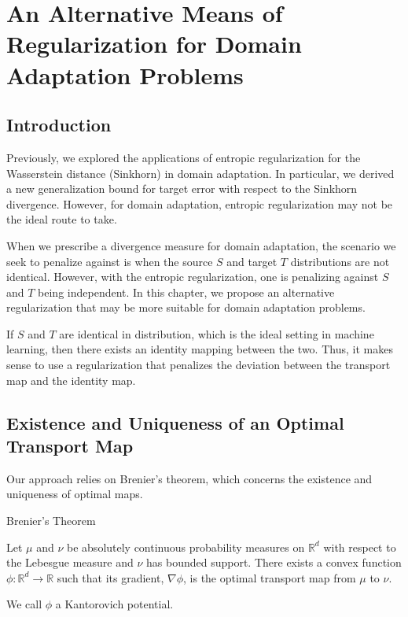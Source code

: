 \chapter{An Alternative Means of Regularization for Domain Adaptation Problems}

\section{Introduction}
Previously, we explored the applications of entropic regularization for the Wasserstein distance (Sinkhorn) in domain adaptation. In particular, we derived a new generalization bound for target error with respect to the Sinkhorn divergence. However, for domain adaptation, entropic regularization may not be the ideal route to take.
 
When we prescribe a divergence measure for domain adaptation, the scenario we seek to penalize against is when the source $S$ and target $T$ distributions are not identical. However, with the entropic regularization, one is penalizing against $S$ and $T$ being independent. In this chapter, we propose an alternative regularization that may be more suitable for domain adaptation problems.

If $S$ and $T$ are identical in distribution, which is the ideal setting in machine learning, then there exists an identity mapping between the two. Thus, it makes sense to use a regularization that penalizes the deviation between the transport map and the identity map.

\newpage

\section{Existence and Uniqueness of an Optimal Transport Map}
Our approach relies on Brenier's theorem, which concerns the existence and uniqueness of optimal maps.

\begin{theorem}{Brenier's Theorem}
	
	Let $\mu$ and $\nu$ be absolutely continuous probability measures on $\mathbb{R}^d$ with respect to the Lebesgue measure and $\nu$ has bounded support. There exists a convex function $\phi: \mathbb{R}^d\to \mathbb{R}$ such that its gradient, $\nabla \phi$, is the optimal transport map from $\mu$ to $\nu$.  
	
\end{theorem}

We call $\phi$ a Kantorovich potential.

